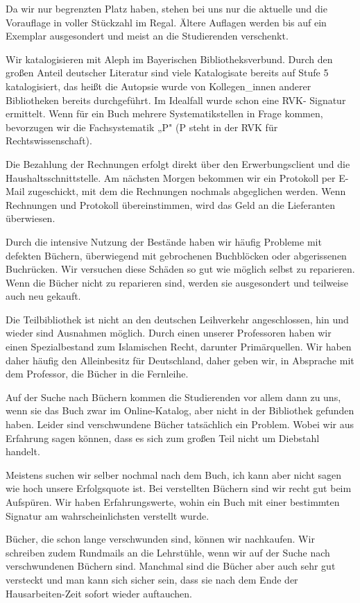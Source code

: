 \documentclass[a4paper,
fontsize=11pt,
oneside,
numbers=noperiodatend,
parskip=half-,
bibliography=totoc,
final
]{scrartcl}
\begin{document}
Da wir nur begrenzten Platz haben, stehen bei uns nur die aktuelle und
die Vorauflage in voller Stückzahl im Regal. Ältere Auflagen werden bis
auf ein Exemplar ausgesondert und meist an die Studierenden verschenkt.

Wir katalogisieren mit Aleph im Bayerischen Bibliotheksverbund. Durch
den großen Anteil deutscher Literatur sind viele Katalogisate bereits
auf Stufe 5 katalogisiert, das heißt die Autopsie wurde von
Kollegen\_innen anderer Bibliotheken bereits durchgeführt. Im Idealfall
wurde schon eine RVK- Signatur ermittelt. Wenn für ein Buch mehrere
Systematikstellen in Frage kommen, bevorzugen wir die Fachsystematik „P"
(P steht in der RVK für Rechtswissenschaft).

Die Bezahlung der Rechnungen erfolgt direkt über den Erwerbungsclient
und die Haushaltsschnittstelle. Am nächsten Morgen bekommen wir ein
Protokoll per E-Mail zugeschickt, mit dem die Rechnungen nochmals
abgeglichen werden. Wenn Rechnungen und Protokoll übereinstimmen, wird
das Geld an die Lieferanten überwiesen.

Durch die intensive Nutzung der Bestände haben wir häufig Probleme mit
defekten Büchern, überwiegend mit gebrochenen Buchblöcken oder
abgerissenen Buchrücken. Wir versuchen diese Schäden so gut wie möglich
selbst zu reparieren. Wenn die Bücher nicht zu reparieren sind, werden
sie ausgesondert und teilweise auch neu gekauft.

Die Teilbibliothek ist nicht an den deutschen Leihverkehr angeschlossen,
hin und wieder sind Ausnahmen möglich. Durch einen unserer Professoren
haben wir einen Spezialbestand zum Islamischen Recht, darunter
Primärquellen. Wir haben daher häufig den Alleinbesitz für Deutschland,
daher geben wir, in Absprache mit dem Professor, die Bücher in die
Fernleihe.

Auf der Suche nach Büchern kommen die Studierenden vor allem dann zu
uns, wenn sie das Buch zwar im Online-Katalog, aber nicht in der
Bibliothek gefunden haben. Leider sind verschwundene Bücher tatsächlich
ein Problem. Wobei wir aus Erfahrung sagen können, dass es sich zum
großen Teil nicht um Diebstahl handelt.

Meistens suchen wir selber nochmal nach dem Buch, ich kann aber nicht
sagen wie hoch unsere Erfolgsquote ist. Bei verstellten Büchern sind wir
recht gut beim Aufspüren. Wir haben Erfahrungswerte, wohin ein Buch mit
einer bestimmten Signatur am wahrscheinlichsten verstellt wurde.

Bücher, die schon lange verschwunden sind, können wir nachkaufen. Wir
schreiben zudem Rundmails an die Lehrstühle, wenn wir auf der Suche nach
verschwundenen Büchern sind. Manchmal sind die Bücher aber auch sehr gut
versteckt und man kann sich sicher sein, dass sie nach dem Ende der
Hausarbeiten-Zeit sofort wieder auftauchen.~
\end{document}
